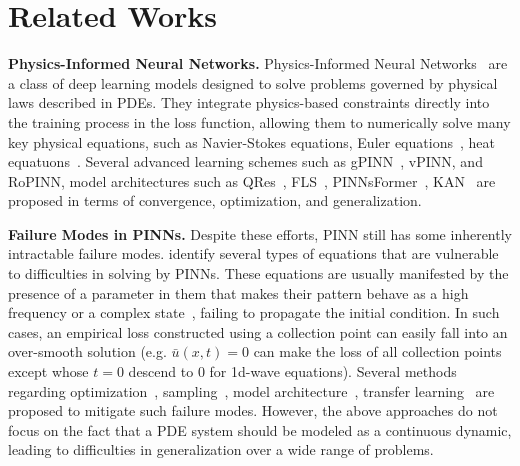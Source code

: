 \section{Related Works}
\label{apx:rw}

\textbf{Physics-Informed Neural Networks.}
Physics-Informed Neural Networks~\cite{raissi2019physics} are a class of deep learning models designed to solve problems governed by physical laws described in PDEs. 
    They integrate physics-based constraints directly into the training process in the loss function, allowing them to numerically solve many key physical equations, such as Navier-Stokes equations\cite{jin2021nsfnets}, Euler equations~\cite{mao2020physics}, heat equatuons~\cite{cai2021physics}. Several advanced learning schemes such as gPINN~\cite{kharazmi2019variational}, vPINN\cite{yu2022gradient}, and RoPINN\cite{wu2024ropinn}, model architectures such as QRes~\cite{bu2021quadratic}, FLS~\cite{wong2022learning}, PINNsFormer~\cite{zhao2024pinnsformer}, KAN~\cite{liu2024kan,liu2024kanw} are proposed in terms of convergence, optimization, and generalization.

\textbf{Failure Modes in PINNs.}
Despite these efforts, PINN still has some inherently intractable failure modes. 
\citet{krishnapriyan2021characterizing} identify several types of equations that are vulnerable to difficulties in solving by PINNs.  
    These equations are usually manifested by the presence of a parameter in them that makes their pattern behave as a high frequency or a complex state~\cite{pmlr-v235-cho24b}, failing to propagate the initial condition. 
        In such cases, an empirical loss constructed using a collection point can easily fall into an over-smooth solution (e.g. $\bar u(x,t)=0$ can make the loss of all collection points except whose $t=0$ descend to 0 for 1d-wave equations). Several methods regarding optimization~\cite{wu2024ropinn,wang20222}, sampling~\cite{gao2023failure,wu2023comprehensive}, model architecture~\cite{zhao2024pinnsformer,pmlr-v235-cho24b,pmlr-v235-nguyen24c}, transfer learning~\cite{xu2023transfer,pmlr-v235-cho24b} are proposed to mitigate such failure modes. 
            However, the above approaches do not focus on the fact that a PDE system should be modeled as a continuous dynamic, leading to difficulties in generalization over a wide range of problems.




